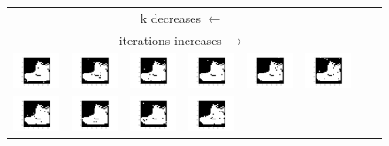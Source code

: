 \documentclass[12pt]{report}
\begin{document}
\begin{figure}[H]
\begin{tabular}{cccccccc}
	\multicolumn{6}{c}{k decreases $\longleftarrow$} \\
	\multicolumn{6}{c}{iterations increases $\longrightarrow$} \\
  \includegraphics[width=0.15\linewidth]{1.png} &   \includegraphics[width=0.15\linewidth]{2.png} &
  \includegraphics[width=0.15\linewidth]{3.png} &   \includegraphics[width=0.15\linewidth]{4.png} &
  \includegraphics[width=0.15\linewidth]{5.png} &   \includegraphics[width=0.15\linewidth]{6.png}  \\
  \includegraphics[width=0.15\linewidth]{7.png} &   \includegraphics[width=0.15\linewidth]{8.png} &
  \includegraphics[width=0.15\linewidth]{9.png} &   \includegraphics[width=0.15\linewidth]{10.png} &

\end{tabular}
\end{figure}
\end{document}

